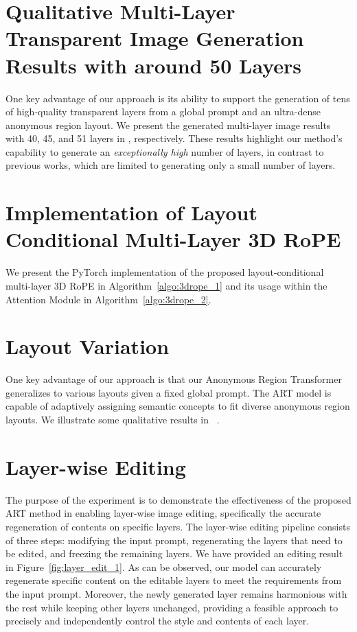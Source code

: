 \section{Qualitative Multi-Layer Transparent Image Generation Results with around 50 Layers}
One key advantage of our approach is its ability to support the generation of tens of high-quality transparent layers from a global prompt and an ultra-dense anonymous region layout. We present the generated multi-layer image results with 40, 45, and 51 layers in , respectively. These results highlight our method’s capability to generate an \emph{exceptionally high} number of layers, in contrast to previous works, which are limited to generating only a small number of layers.



\section{Implementation of Layout Conditional Multi-Layer 3D RoPE}
We present the PyTorch implementation of the proposed layout-conditional multi-layer 3D RoPE in Algorithm~\ref{algo:3drope_1} and its usage within the Attention Module in Algorithm~\ref{algo:3drope_2}.


\section{Layout Variation}
One key advantage of our approach is that our Anonymous Region Transformer generalizes to various layouts given a fixed global prompt. The ART model is capable of adaptively assigning semantic concepts to fit diverse anonymous region layouts. We illustrate some qualitative results in ~.


\section{Layer-wise Editing}

The purpose of the experiment is to demonstrate the effectiveness of the proposed ART method in enabling layer-wise image editing, specifically the accurate regeneration of contents on specific layers. 
The layer-wise editing pipeline consists of three steps: modifying the input prompt, regenerating the layers that need to be edited, and freezing the remaining layers. 
We have provided an editing result in Figure~\ref{fig:layer_edit_1}. As can be observed, our model can accurately regenerate specific content on the editable layers to meet the requirements from the input prompt. Moreover, the newly generated layer remains harmonious with the rest while keeping other layers unchanged, providing a feasible approach to precisely and independently control the style and contents of each layer.



